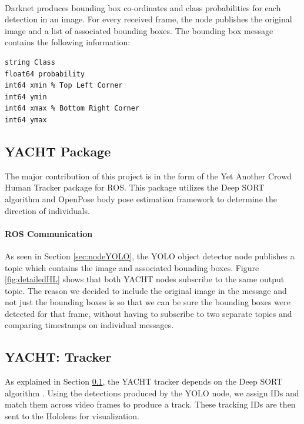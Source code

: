 \paragraph{} Darknet produces bounding box co-ordinates and class probabilities for each detection in an image. For every received frame, the node publishes the original image and a list of associated bounding boxes. The bounding box message contains the following information: \\

\begin{lstlisting}[language=Mymatlab,caption={BoundingBox.msg},label={bbmsg}]
string Class
float64 probability
int64 xmin % Top Left Corner
int64 ymin
int64 xmax % Bottom Right Corner
int64 ymax
\end{lstlisting}

\subsection{YACHT Package} \label{sec:YACHT}
The major contribution of this project is in the form of the Yet Another Crowd Human Tracker package for ROS. This package utilizes the Deep SORT algorithm and OpenPose body pose estimation framework to determine the direction of individuals.

\paragraph{ROS Communication} As seen in Section \ref{sec:nodeYOLO}, the YOLO object detector node publishes a topic which contains the image and associated bounding boxes. Figure \ref{fig:detailedHL} shows that both YACHT nodes subscribe to the same output topic. The reason we decided to include the original image in the message and not just the bounding boxes is so that we can be sure the bounding boxes were detected for that frame, without having to subscribe to two separate topics and comparing timestamps on individual messages.

\subsection{YACHT: Tracker}
As explained in Section \ref{sec:YACHT}, the YACHT tracker depends on the Deep SORT algorithm \cite{Wojke2018}. Using the detections produced by the YOLO node, we assign IDs and match them across video frames to produce a track. These tracking IDs are then sent to the Hololens for visualization.


